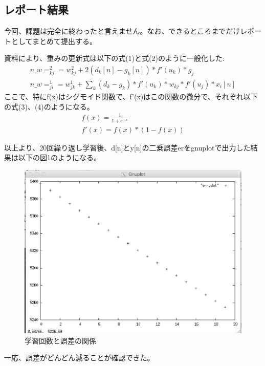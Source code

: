 \documentclass[a4j,12]{jarticle}
\begin{document}
\subsection{レポート結果}
今回、課題は完全に終わったと言えません。なお、できるところまでだけレポートとしてまとめて提出する。\par
資料により、重みの更新式は以下の式(1)と式(2)のように一般化した:
\begin{eqnarray} 
  n\_w=^2_{kj}=w^2_{kj}+2(d_k[n]-g_k[n])*f'(u_k)*g_j\\
  n\_w=^1_{ji}=w^1_{jk}+{\sum_k(d_k-g_k)*f'(u_k)*w_{kj}}*f'(u_j)*x_i[n]
\end{eqnarray}%
ここで、特にf(x)はシグモイド関数で、f'(x)はこの関数の微分で、それぞれ以下の式(3)、(4)のようになる。
\begin{eqnarray}
  f(x)=\frac{1}{1+e^{-x}}\\
  f'(x)=f(x)*(1-f(x))
\end{eqnarray}

以上より、20回繰り返し学習後、d[n]とy[n]の二乗誤差erをgnuplotで出力した結果は以下の図1のようになる。
\begin{figure}[htpb]
  \begin{center}
    \includegraphics[width=15cm]{err.eps}
    \caption{学習回数と誤差の関係}
    \label{micon}
  \end{center}
\end{figure}
一応、誤差がどんどん減ることが確認できた。
\end{document}
